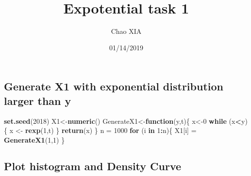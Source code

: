 \documentclass[]{article}
\title{Expotential task 1}
\author{Chao XIA}
\date{01/14/2019}
\newenvironment{Shaded}{\begin{snugshade}}{\end{snugshade}}
\newcommand{\KeywordTok}[1]{\textcolor[rgb]{0.13,0.29,0.53}{\textbf{#1}}}
\newcommand{\DecValTok}[1]{\textcolor[rgb]{0.00,0.00,0.81}{#1}}
\newcommand{\StringTok}[1]{\textcolor[rgb]{0.31,0.60,0.02}{#1}}
\newcommand{\ControlFlowTok}[1]{\textcolor[rgb]{0.13,0.29,0.53}{\textbf{#1}}}
\newcommand{\OperatorTok}[1]{\textcolor[rgb]{0.81,0.36,0.00}{\textbf{#1}}}
\newcommand{\NormalTok}[1]{#1}
\begin{document}
\maketitle

\subsection{Generate X1 with exponential distribution larger than
y}\label{generate-x1-with-exponential-distribution-larger-than-y}

\begin{Shaded}
\begin{Highlighting}[]
\KeywordTok{set.seed}\NormalTok{(}\DecValTok{2018}\NormalTok{)}
\NormalTok{X1<-}\KeywordTok{numeric}\NormalTok{()}
\NormalTok{GenerateX1<-}\ControlFlowTok{function}\NormalTok{(y,t)\{}
\NormalTok{  x<-}\DecValTok{0}
  \ControlFlowTok{while}\NormalTok{ (x}\OperatorTok{<}\NormalTok{y)\{}
\NormalTok{    x <-}\StringTok{ }\KeywordTok{rexp}\NormalTok{(}\DecValTok{1}\NormalTok{,t)}
\NormalTok{  \}}
  \KeywordTok{return}\NormalTok{(x)}
\NormalTok{\}}
\NormalTok{n =}\StringTok{ }\DecValTok{1000}
\ControlFlowTok{for}\NormalTok{ (i }\ControlFlowTok{in} \DecValTok{1}\OperatorTok{:}\NormalTok{n)\{}
\NormalTok{  X1[i] =}\StringTok{ }\KeywordTok{GenerateX1}\NormalTok{(}\DecValTok{1}\NormalTok{,}\DecValTok{1}\NormalTok{)}
\NormalTok{\}}
\end{Highlighting}
\end{Shaded}

\subsection{Plot histogram and Density
Curve}\label{plot-histogram-and-density-curve}
\end{document}
